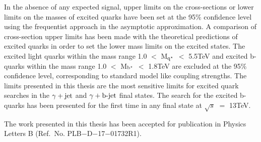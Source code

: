 \documentclass[12pt,a4]{article}
\begin{document}
In the absence of any expected signal, upper limits on the cross-sections or lower limits on the masses of excited quarks have been set at the 95$\%$ confidence level
using the frequentist approach in the asymptotic approximation. A comparison of cross-section upper limits has been made with the theoretical predictions of
excited quarks in order to set the lower mass limits on the excited states. The excited light quarks within the mass range
1.0 $<$ M$_{\mathrm{q^\star}}$ $<$ 5.5\unit{TeV} and excited b-quarks within the mass range 1.0 $<$ M$_{\mathrm{b^\star}}$ $<$ 1.8\unit{TeV} are excluded at the 95$\%$ confidence level,
corresponding to standard model like coupling strengths. The limits presented in this thesis are the most
sensitive limits for excited quark searches in the $\gamma+\mathrm{jet}$ and $\gamma+\mathrm{b}\textrm{-}\mathrm{jet}$ final states. The search for the excited b-quarks has been presented for the first time
in any final state at $\sqrt{s}$ $=$ 13\unit{TeV}.

The work presented in this thesis has been accepted for publication in Physics Letters B (Ref.\ No.\: PLB$-$D$-$17$-$01732R1).
\end{document}
